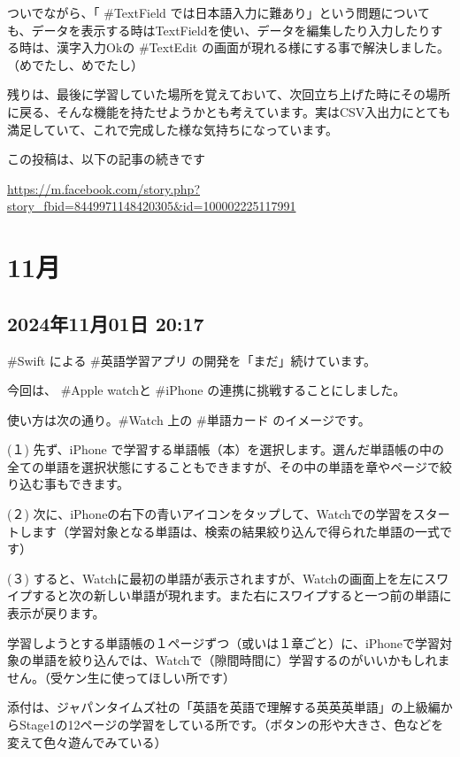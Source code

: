 \documentclass[facebook_diary.tex]{subfiles}
\begin{document}
ついでながら、「 \#TextField では日本語入力に難あり」という問題についても、データを表示する時はTextFieldを使い、データを編集したり入力したりする時は、漢字入力Okの \#TextEdit の画面が現れる様にする事で解決しました。（めでたし、めでたし）


残りは、最後に学習していた場所を覚えておいて、次回立ち上げた時にその場所に戻る、そんな機能を持たせようかとも考えています。実はCSV入出力にとても満足していて、これで完成した様な気持ちになっています。


この投稿は、以下の記事の続きです

\url{https://m.facebook.com/story.php?story_fbid=8449971148420305&id=100002225117991}



\section{11月}

\subsection*{2024年11月01日 20:17}

\#Swift による \#英語学習アプリ の開発を「まだ」続けています。

今回は、 \#Apple watchと \#iPhone の連携に挑戦することにしました。

使い方は次の通り。\#Watch 上の \#単語カード のイメージです。


(１) 先ず、iPhone で学習する単語帳（本）を選択します。選んだ単語帳の中の全ての単語を選択状態にすることもできますが、その中の単語を章やページで絞り込む事もできます。

(２) 次に、iPhoneの右下の青いアイコンをタップして、Watchでの学習をスタートします（学習対象となる単語は、検索の結果絞り込んで得られた単語の一式です）

(３) すると、Watchに最初の単語が表示されますが、Watchの画面上を左にスワイプすると次の新しい単語が現れます。また右にスワイプすると一つ前の単語に表示が戻ります。


学習しようとする単語帳の１ページずつ（或いは１章ごと）に、iPhoneで学習対象の単語を絞り込んでは、Watchで（隙間時間に）学習するのがいいかもしれません。（受ケン生に使ってほしい所です）


添付は、ジャパンタイムズ社の「英語を英語で理解する英英英単語」の上級編からStage1の12ページの学習をしている所です。（ボタンの形や大きさ、色などを変えて色々遊んでみている）
\end{document}
